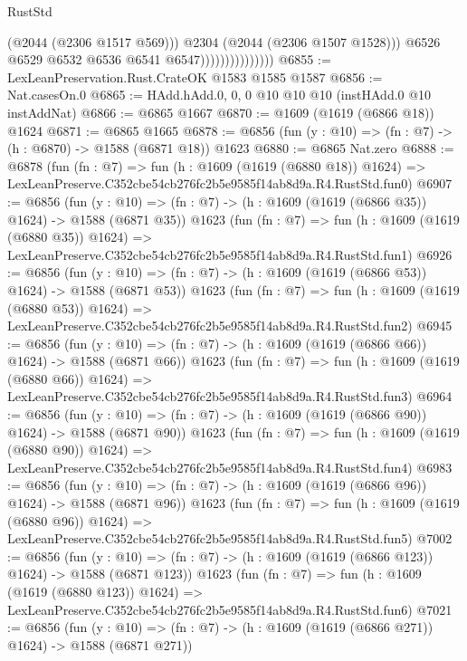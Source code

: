 \begin{lexlean}{RustStd}
\begin{coremodule}
                                      (@2044 (@2306 @1517 @569)))
                                    @2304
                                    (@2044 (@2306 @1507 @1528)))
                                  @6526
                                  @6529
                                  @6532
                                  @6536
                                  @6541
                                  @6547)))))))))))))))
@6855 := LexLeanPreservation.Rust.CrateOK @1583 @1585 @1587
@6856 := Nat.casesOn.{0}
@6865 := HAdd.hAdd.{0, 0, 0} @10 @10 @10 (instHAdd.{0} @10 instAddNat)
@6866 := @6865 @1667
@6870 := @1609 (@1619 (@6866 @18)) @1624
@6871 := @6865 @1665
@6878 := @6856 (fun (y : @10) => (fn : @7) -> (h : @6870) -> @1588 (@6871 @18)) @1623
@6880 := @6865 Nat.zero
@6888 := @6878
    (fun (fn : @7) =>
    fun (h : @1609 (@1619 (@6880 @18)) @1624) =>
    LexLeanPreserve.C352cbe54cb276fc2b5e9585f14ab8d9a.R4.RustStd.fun0)
@6907 := @6856
    (fun (y : @10) => (fn : @7) -> (h : @1609 (@1619 (@6866 @35)) @1624) -> @1588 (@6871 @35))
    @1623
    (fun (fn : @7) =>
    fun (h : @1609 (@1619 (@6880 @35)) @1624) =>
    LexLeanPreserve.C352cbe54cb276fc2b5e9585f14ab8d9a.R4.RustStd.fun1)
@6926 := @6856
    (fun (y : @10) => (fn : @7) -> (h : @1609 (@1619 (@6866 @53)) @1624) -> @1588 (@6871 @53))
    @1623
    (fun (fn : @7) =>
    fun (h : @1609 (@1619 (@6880 @53)) @1624) =>
    LexLeanPreserve.C352cbe54cb276fc2b5e9585f14ab8d9a.R4.RustStd.fun2)
@6945 := @6856
    (fun (y : @10) => (fn : @7) -> (h : @1609 (@1619 (@6866 @66)) @1624) -> @1588 (@6871 @66))
    @1623
    (fun (fn : @7) =>
    fun (h : @1609 (@1619 (@6880 @66)) @1624) =>
    LexLeanPreserve.C352cbe54cb276fc2b5e9585f14ab8d9a.R4.RustStd.fun3)
@6964 := @6856
    (fun (y : @10) => (fn : @7) -> (h : @1609 (@1619 (@6866 @90)) @1624) -> @1588 (@6871 @90))
    @1623
    (fun (fn : @7) =>
    fun (h : @1609 (@1619 (@6880 @90)) @1624) =>
    LexLeanPreserve.C352cbe54cb276fc2b5e9585f14ab8d9a.R4.RustStd.fun4)
@6983 := @6856
    (fun (y : @10) => (fn : @7) -> (h : @1609 (@1619 (@6866 @96)) @1624) -> @1588 (@6871 @96))
    @1623
    (fun (fn : @7) =>
    fun (h : @1609 (@1619 (@6880 @96)) @1624) =>
    LexLeanPreserve.C352cbe54cb276fc2b5e9585f14ab8d9a.R4.RustStd.fun5)
@7002 := @6856
    (fun (y : @10) => (fn : @7) -> (h : @1609 (@1619 (@6866 @123)) @1624) -> @1588 (@6871 @123))
    @1623
    (fun (fn : @7) =>
    fun (h : @1609 (@1619 (@6880 @123)) @1624) =>
    LexLeanPreserve.C352cbe54cb276fc2b5e9585f14ab8d9a.R4.RustStd.fun6)
@7021 := @6856
    (fun (y : @10) => (fn : @7) -> (h : @1609 (@1619 (@6866 @271)) @1624) -> @1588 (@6871 @271))

\end{coremodule}
\end{lexlean}
